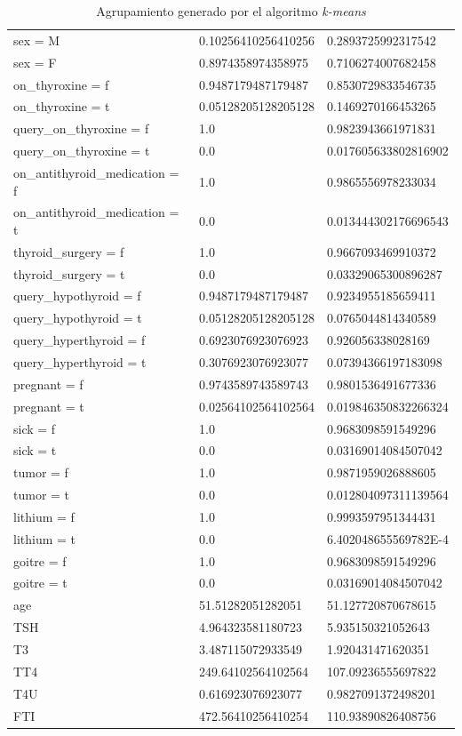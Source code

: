 \documentclass[osajnl,twocolumn,showpacs,superscriptaddress,10pt,floatfix]{revtex4-1} %
\begin{document}
\begin{table}[ht]
\begin{tabular}{|l|l|l|}
        sex = M & 0.10256410256410256 & 0.2893725992317542 \\
        sex = F & 0.8974358974358975 & 0.7106274007682458 \\
        on\_thyroxine = f & 0.9487179487179487 & 0.8530729833546735 \\
        on\_thyroxine = t & 0.05128205128205128 & 0.1469270166453265 \\
        query\_on\_thyroxine = f & 1.0 & 0.9823943661971831 \\
        query\_on\_thyroxine = t & 0.0 & 0.017605633802816902 \\
        on\_antithyroid\_medication = f & 1.0 & 0.9865556978233034 \\
        on\_antithyroid\_medication = t & 0.0 & 0.013444302176696543 \\
        thyroid\_surgery = f & 1.0 & 0.9667093469910372 \\
        thyroid\_surgery = t & 0.0 & 0.03329065300896287 \\
        query\_hypothyroid = f & 0.9487179487179487 & 0.9234955185659411 \\
        query\_hypothyroid = t & 0.05128205128205128 & 0.0765044814340589 \\
        query\_hyperthyroid = f & 0.6923076923076923 & 0.926056338028169 \\
        query\_hyperthyroid = t & 0.3076923076923077 & 0.07394366197183098 \\
        pregnant = f & 0.9743589743589743 & 0.9801536491677336 \\
        pregnant = t & 0.02564102564102564 & 0.019846350832266324 \\
        sick = f & 1.0 & 0.9683098591549296 \\
        sick = t & 0.0 & 0.03169014084507042 \\
        tumor = f & 1.0 & 0.9871959026888605 \\
        tumor = t & 0.0 & 0.012804097311139564 \\
        lithium = f & 1.0 & 0.9993597951344431 \\
        lithium = t & 0.0 & 6.402048655569782E-4 \\
        goitre = f & 1.0 & 0.9683098591549296 \\
        goitre = t & 0.0 & 0.03169014084507042 \\
        age & 51.51282051282051 & 51.127720870678615 \\
        TSH & 4.964323581180723 & 5.935150321052643 \\
        T3 & 3.487115072933549 & 1.920431471620351 \\
        TT4 & 249.64102564102564 & 107.09236555697822 \\
        T4U & 0.616923076923077 & 0.9827091372498201 \\
        FTI & 472.56410256410254 & 110.93890826408756 \\
        \hline
    \end{tabular}
    \caption{Agrupamiento generado por el algoritmo \textit{k-means}}
    \label{table:k_means_model}
\end{table}
\end{document}
